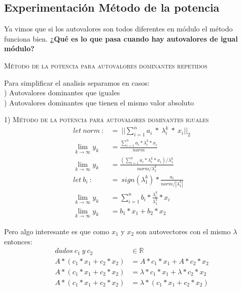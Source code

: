 
\vspace{1em}
\subsection{Experimentación Método de la potencia} 

\begin{large}  
    Ya vimos que si los autovalores son todos diferentes en módulo el método funciona bien. \textbf{¿Qué es lo que pasa cuando hay autovalores de igual módulo?}
\end{large}   


\vspace{2em}
\noindent \textsc{Método de la potencia para autovalores dominantes repetidos}

\vspace{2em}
\noindent Para simplificar el analisis separamos en casos: \\
) Autovalores dominantes que iguales \\
) Autovalores dominantes que tienen el mismo valor absoluto
\vspace{2em}



\noindent \textsc{1) Método de la potencia para autovalores dominantes iguales}
\begin{align}
    let \ norm \ :&= \ ||\sum_{i=1}^{n} a_i \ * \ \lambda_{i}^{k} \ * \ x_i||_2 \\
    \lim_{k \to \infty} y_k &= \frac{\sum_{i=1}^{n} a_i * \lambda_{i}^{k} * x_i }{norm} \\ 
    \lim_{k \to \infty} y_k &= \frac{(\sum_{i=1}^{n} a_i * \lambda_{i}^{k} * x_i) / \lambda_{1}^{k}}{norm / \lambda_{1}^{k}} \\
    let \ b_i \ :&= \ sign(\lambda_{1}^{k}) * \frac{a_i}{norm / |\lambda_{1}^{k}|} \\
    \lim_{k \to \infty} y_k &= \sum_{i=1}^{n} b_i * \frac{\lambda_{i}^{k}}{\lambda_{1}^{k}} * x_i \\
    \lim_{k \to \infty} y_k &= b_1 * x_1 + b_2 * x_2 
\end{align}

\vspace{1em}
Pero algo interesante es que como $x_1$ y $x_2$ son autovectores con el mismo $\lambda$ entonces:
\begin{align}
    dados\ c_1 \ y \ c_2 &\in \mathbb{R} \\
    A * (c_1 * x_1 + c_2 * x_2) &= A * c_1 * x_1 + A * c_2 * x_2 \\
    A * (c_1 * x_1 + c_2 * x_2) &= \lambda * c_1 * x_1 + \lambda * c_2 * x_2 \\
    A * (c_1 * x_1 + c_2 * x_2) &= \lambda * (c_1 * x_1 + c_2 * x_2) 
\end{align}

